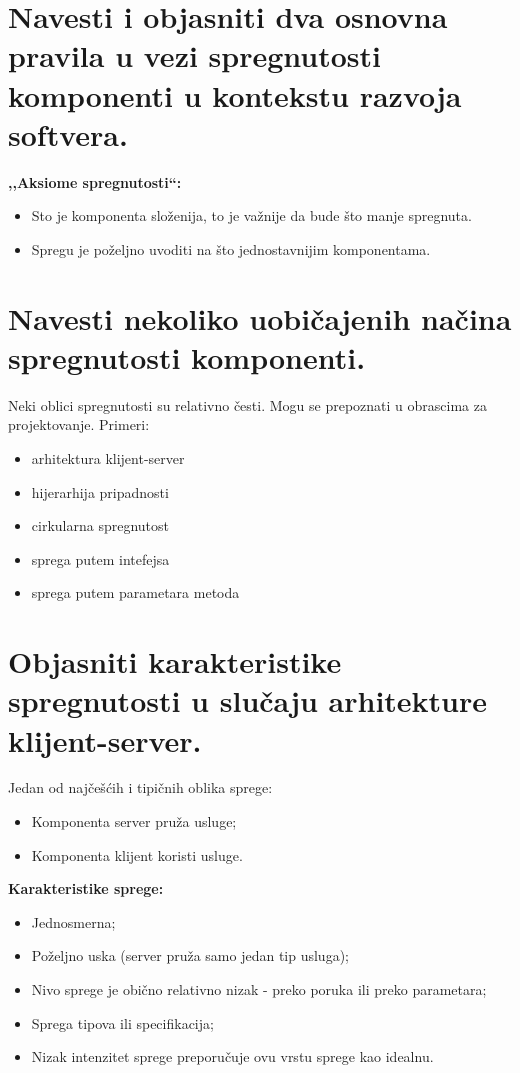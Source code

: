 \documentclass[a4paper]{article}
\begin{document}
\section{Navesti i objasniti dva osnovna pravila u vezi spregnutosti komponenti u 
         kontekstu razvoja softvera.}
  \textbf{,,Aksiome spregnutosti``:}
  \begin{itemize}
    \item Sto je komponenta složenija, to je važnije da bude što manje spregnuta.
    \item Spregu je poželjno uvoditi na što jednostavnijim komponentama.
  \end{itemize}
  
\section{Navesti nekoliko uobičajenih načina spregnutosti komponenti.}
  Neki oblici spregnutosti su relativno česti. 
  Mogu se prepoznati u obrascima za projektovanje. Primeri:
  \begin{itemize}
    \item arhitektura klijent-server
    \item hijerarhija pripadnosti
    \item cirkularna spregnutost
    \item sprega putem intefejsa
    \item sprega putem parametara metoda
  \end{itemize}

\section{Objasniti karakteristike spregnutosti u slučaju arhitekture klijent-server.}
  \noindent Jedan od najčešćih i tipičnih oblika sprege:
  \begin{itemize}
    \item Komponenta server pruža usluge;
    \item Komponenta klijent koristi usluge.
  \end{itemize}
  \textbf{Karakteristike sprege:}
  \begin{itemize}
    \item Jednosmerna;
    \item Poželjno uska (server pruža samo jedan tip usluga);
    \item Nivo sprege je obično relativno nizak - preko poruka ili preko parametara;
    \item Sprega tipova ili specifikacija;
    \item Nizak intenzitet sprege preporučuje ovu vrstu sprege kao idealnu.
  \end{itemize}
\end{document}
